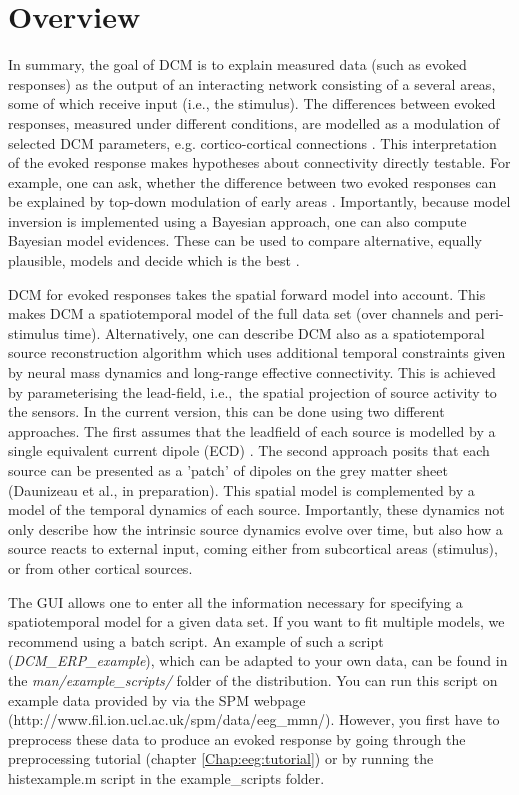 \section{Overview}
In summary, the goal of DCM is to explain measured data (such as evoked
responses) as the output of an interacting network consisting of a several
areas, some of which receive input (i.e., the stimulus). The differences between
evoked responses, measured under different conditions, are modelled as
a modulation of selected DCM parameters, e.g. cortico-cortical
connections \cite{od_dcm_erp}. This interpretation of the evoked
response makes hypotheses about connectivity directly testable. For
example, one can ask, whether the difference between two
evoked responses can be explained by top-down modulation of early areas
\cite{mg_dcm_repro}. Importantly, because model inversion is implemented
using a Bayesian approach, one can also compute Bayesian model evidences. These
can be used to compare alternative, equally plausible, models and
decide which is the best \cite{stefan_neurodynamics}.

DCM for evoked responses takes the spatial forward model into
account. This makes DCM a spatiotemporal model of the full data set
(over channels and peri-stimulus time). Alternatively, one can
describe DCM also as a spatiotemporal source reconstruction algorithm which uses
additional temporal constraints given by neural mass dynamics and
long-range effective connectivity. This is achieved by parameterising
the lead-field, i.e.,~the spatial projection of source
activity to the sensors. In the current version, this can be done
using two different approaches. The first assumes that the leadfield
of each source is modelled by a single equivalent current dipole
(ECD) \cite{sjk_dcm_erp}. The second approach posits that each source
can be presented as a 'patch' of dipoles on the grey matter sheet
(Daunizeau et al., in preparation). This spatial model is complemented
by a model of the temporal dynamics of each source. Importantly, these
dynamics not only describe how the intrinsic source dynamics evolve
over time, but also how a source reacts to external input, coming
either from subcortical areas (stimulus), or from other cortical
sources.

The GUI allows one to enter all the information necessary for specifying a
spatiotemporal model for a given data set. If you want to fit multiple
models, we recommend using a batch script. An example of such
a script (\textit{DCM\_ERP\_example}), which can be adapted to your
own data, can be found in the \textit{man/example\_scripts/} folder of
the distribution. You can run this script on example data provided by via the SPM webpage (http://www.fil.ion.ucl.ac.uk/spm/data/eeg\_mmn/). However, you first have to preprocess these data to produce an evoked response by going through the preprocessing tutorial (chapter \ref{Chap:eeg:tutorial}) or by running the histexample.m script in the example\_scripts folder.

